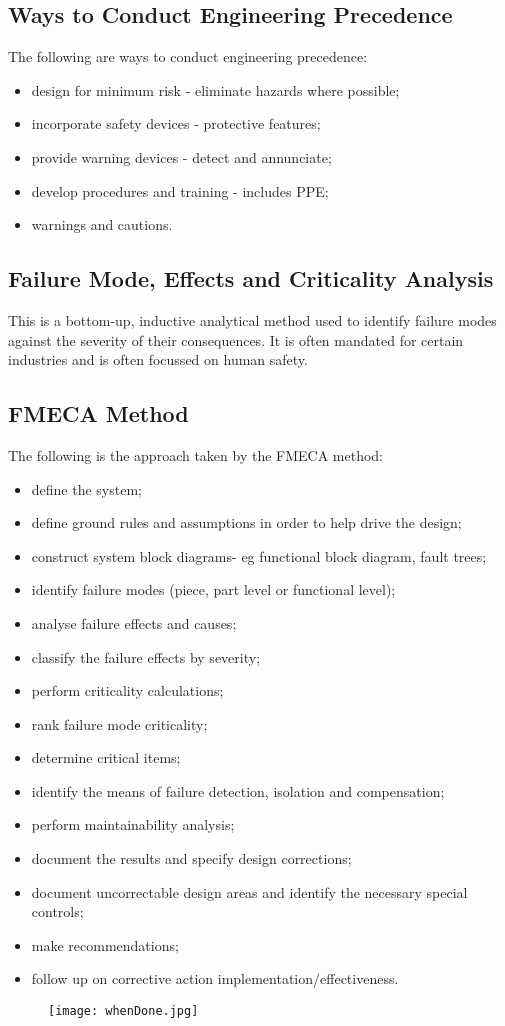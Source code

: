 \documentclass[journal]{IEEEtran}
\begin{document}
\subsection{Ways to Conduct Engineering Precedence}
The following are ways to conduct engineering precedence:
\begin{itemize}
	\item design for minimum risk - eliminate hazards where possible;
	\item incorporate safety devices - protective features;
	\item provide warning devices -  detect and annunciate;
	\item develop procedures and training - includes PPE;
	\item warnings and cautions.
\end{itemize}
\subsection{Failure Mode, Effects and Criticality Analysis}
This is a bottom-up, inductive analytical method used to identify failure modes
against the severity of their consequences. It is often mandated for certain industries and is often focussed on human safety.
\subsection{FMECA Method}
The following is the approach taken by the FMECA method:
\begin{itemize}
	\item define the system;
	\item define ground rules and assumptions in order to help drive the design;
	\item construct system block diagrams- eg functional block diagram, fault trees;
	\item identify failure modes (piece, part level or functional level);
	\item analyse failure effects and causes;
	\item classify the failure effects by severity;
	\item perform criticality calculations;
	\item rank failure mode criticality;
	\item determine critical items;
	\item identify the means of failure detection, isolation and compensation;
	\item perform maintainability analysis;
	\item document the results and specify design corrections;
	\item document uncorrectable design areas and identify the necessary special controls;
	\item make recommendations;
	\item follow up on corrective action implementation/effectiveness.
\end{itemize}
	\begin{figure}[h]
		\hfill\texttt{[image: whenDone.jpg]}\hspace*{\fill}
	\end{figure}
\end{document}

